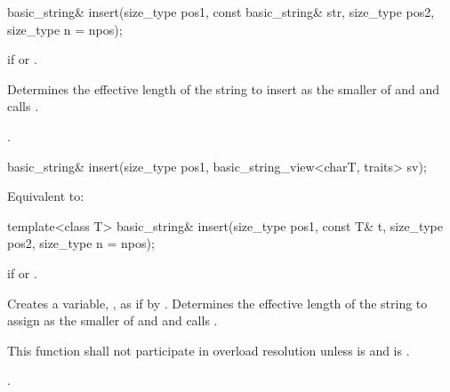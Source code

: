 %
\begin{itemdecl}
basic_string&
  insert(size_type pos1,
         const basic_string& str,
         size_type pos2, size_type n = npos);
\end{itemdecl}

\begin{itemdescr}
\pnum
\throws
{}
if
or
.

\pnum
\effects
Determines the effective length  of the string to insert as the smaller
of  and
 and calls .

\pnum
\returns
{}.
\end{itemdescr}

%
\begin{itemdecl}
basic_string& insert(size_type pos1, basic_string_view<charT, traits> sv);
\end{itemdecl}

\begin{itemdescr}
\pnum
\effects
Equivalent to: 
\end{itemdescr}

%
\begin{itemdecl}
template<class T>
  basic_string& insert(size_type pos1, const T& t,
                       size_type pos2, size_type n = npos);
\end{itemdecl}

\begin{itemdescr}
\pnum
\throws
{}
if
or
.

\pnum
\effects
Creates a variable, , as if by .
Determines the effective length  of the string to assign
as the smaller of  and 
and calls .

\pnum
\remarks
This function shall not participate in overload resolution
unless 
is  and  is .

\pnum
\returns
{}.
\end{itemdescr}

